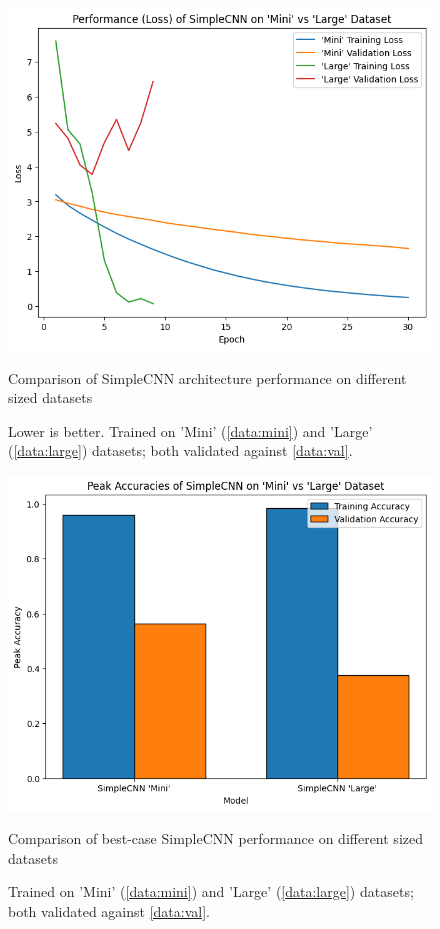             \begin{figure}[h]
                \centering
                \includegraphics[width=\textwidth]{images/SimpleCNNs_TrainLoss.png}
                \caption{Comparison of SimpleCNN architecture performance on different sized datasets}
                \label{fig:SimpleCNNs_TrainLoss-Mini_Train}
                \caption*{Lower is better. Trained on 'Mini' (\ref{data:mini}) and 'Large' (\ref{data:large}) datasets; both validated against \ref{data:val}.}
            \end{figure}
    
            \begin{figure}[h]
                \centering
                \includegraphics[width=\textwidth]{images/SimpleCNNs_PeakAccuracy.png}
                \caption{Comparison of best-case SimpleCNN performance on different sized datasets}
                \label{fig:SimpleCNNs_PeakAccuracy-Mini_Train}
                \caption*{Trained on 'Mini' (\ref{data:mini}) and 'Large' (\ref{data:large}) datasets; both validated against \ref{data:val}.}
            \end{figure}
    
